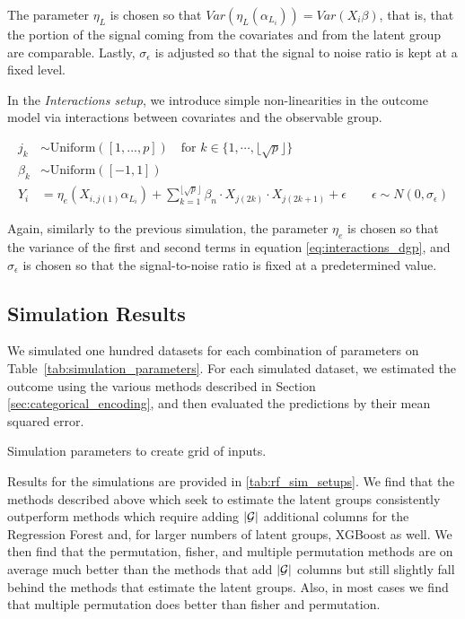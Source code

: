 \documentclass{article}
\theoremstyle{plain}
\theoremstyle{definition}
\theoremstyle{remark}
\begin{document}
\noindent  The parameter $\eta_{L}$ is chosen so that  $Var(\eta_{L}(\alpha_{L_i})) = Var(X_{i}\beta)$, that is, that the portion of the signal coming from the covariates and from the latent group are comparable. Lastly, $\sigma_{\epsilon}$ is adjusted so that the signal to noise ratio is kept at a fixed level.

In the \emph{Interactions setup}, we introduce simple non-linearities in the outcome model via interactions between covariates and the observable group.

\begin{align}
    j_k &\sim \text{Uniform}([1,...,p]) \quad \text{for } k \in \{1, \cdots, \lfloor \sqrt{p} \rfloor \}   \\
    \beta_k &\sim \text{Uniform}([-1,1]) \\
    Y_{i} &=
    \eta_{e} (X_{i,j(1)} \alpha_{L_{i}}) +
    \sum_{k=1}^{\lfloor \sqrt{p} \rfloor} \beta_n \cdot X_{j(2k)} \cdot X_{j(2k+1)} +  \epsilon \qquad \epsilon \sim N(0, \sigma_{\epsilon})
    \label{eq:interactions_dgp}
\end{align}

\noindent Again, similarly to the previous simulation, the parameter $\eta_{e}$ is chosen so that the variance of the first and second terms in equation \ref{eq:interactions_dgp}, and $\sigma_{\epsilon}$ is chosen so that the signal-to-noise ratio is fixed at a predetermined value.


\subsection{Simulation Results}
\label{sec:simulation_results}






We simulated one hundred datasets for each combination of parameters on Table~\ref{tab:simulation_parameters}. For each simulated dataset, we estimated the outcome using the various methods described in Section \ref{sec:categorical_encoding}, and then evaluated the predictions by their mean squared error.

\begin{table}[htbp]
\centering

\caption{Simulation parameters to create grid of inputs.}
\label{tab:simulation_parameters}
\end{table}

Results for the simulations are provided in \ref{tab:rf_sim_setups}. We find that the methods described above which seek to estimate the latent groups consistently outperform methods which require adding $|\mathcal{G}|$ additional columns for the Regression Forest and, for larger numbers of latent groups, XGBoost as well. We then find that the permutation, fisher, and multiple permutation methods are on average much better than the methods that add $|\mathcal{G}|$ columns but still slightly fall behind the methods that estimate the latent groups. Also, in most cases we find that multiple permutation does better than fisher and permutation.
\end{document}

